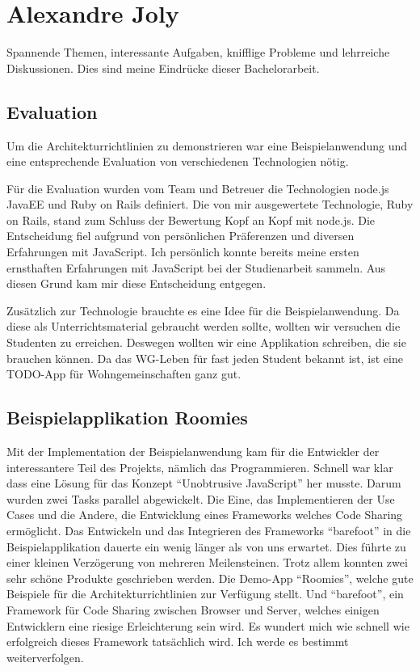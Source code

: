 \section{Alexandre Joly}
Spannende Themen, interessante Aufgaben, knifflige Probleme und lehrreiche Diskussionen. Dies sind meine Eindrücke dieser Bachelorarbeit.

\subsection*{Evaluation}
Um die Architekturrichtlinien zu demonstrieren war eine Beispielanwendung und eine entsprechende Evaluation von verschiedenen Technologien nötig.

Für die Evaluation wurden vom Team und Betreuer die Technologien node.js JavaEE und Ruby on Rails definiert. Die von mir ausgewertete Technologie, Ruby on Rails, stand zum Schluss der Bewertung Kopf an Kopf mit node.js. Die Entscheidung fiel aufgrund von persönlichen Präferenzen und diversen Erfahrungen mit JavaScript. Ich persönlich konnte bereits meine ersten ernsthaften Erfahrungen mit JavaScript bei der Studienarbeit sammeln. Aus diesen Grund kam mir diese Entscheidung entgegen.

Zusätzlich zur Technologie brauchte es eine Idee für die Beispielanwendung. Da diese als Unterrichtsmaterial gebraucht werden sollte, wollten wir versuchen die Studenten zu erreichen. Deswegen wollten wir eine Applikation schreiben, die sie brauchen können. Da das WG-Leben für fast jeden Student bekannt ist, ist eine TODO-App für Wohngemeinschaften ganz gut.

\subsection*{Beispielapplikation Roomies}
Mit der Implementation der Beispielanwendung kam für die Entwickler der interessantere Teil des Projekts, nämlich das Programmieren.
Schnell war klar dass eine Lösung für das Konzept ``Unobtrusive JavaScript'' her musste. Darum wurden zwei Tasks parallel abgewickelt. Die Eine, das Implementieren der Use Cases und die Andere, die Entwicklung eines Frameworks welches Code Sharing ermöglicht. Das Entwickeln und das Integrieren des Frameworks ``barefoot'' in die Beispielapplikation dauerte ein wenig länger als von uns erwartet. Dies führte zu einer kleinen Verzögerung von mehreren Meilensteinen. Trotz allem konnten zwei sehr schöne Produkte geschrieben werden. Die Demo-App ``Roomies'', welche gute Beispiele für die Architekturrichtlinien zur Verfügung stellt. Und ``barefoot'', ein Framework für Code Sharing zwischen Browser und Server, welches einigen Entwicklern eine riesige Erleichterung sein wird. Es wundert mich wie schnell wie erfolgreich dieses Framework tatsächlich wird. Ich werde es bestimmt weiterverfolgen.

